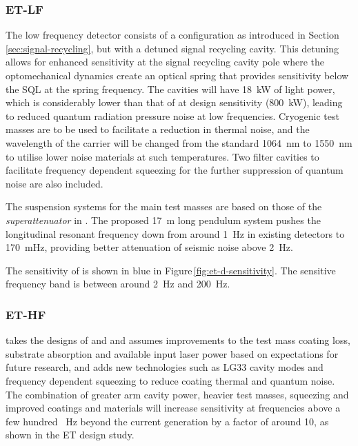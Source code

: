 \subsubsection{ET-LF}
The low frequency detector consists of a \DRFPMI{} configuration as introduced in Section\,\ref{sec:signal-recycling}, but with a detuned signal recycling cavity. This detuning allows for enhanced sensitivity at the signal recycling cavity pole where the optomechanical dynamics create an optical spring that provides sensitivity below the \gls{SQL} at the spring frequency. The cavities will have \SI{18}{\kilo\watt} of light power, which is considerably lower than that of \ALIGO{} at design sensitivity (\SI{800}{\kilo\watt}), leading to reduced quantum radiation pressure noise at low frequencies. Cryogenic test masses are to be used to facilitate a reduction in thermal noise, and the wavelength of the carrier will be changed from the standard \SI{1064}{\nano\meter} to \SI{1550}{\nano\meter} to utilise lower noise materials at such temperatures. Two filter cavities to facilitate frequency dependent squeezing for the further suppression of quantum noise are also included.

The suspension systems for the main test masses are based on those of the \emph{superattenuator} in \VIRGO{} \cite{Acernese2010}. The proposed \SI{17}{\meter} long pendulum system pushes the longitudinal resonant frequency down from around \SI{1}{\hertz} in existing detectors to \SI{170}{\milli\hertz}, providing better attenuation of seismic noise above \SI{2}{\hertz}.

The sensitivity of \ETLF{} is shown in blue in Figure\,\ref{fig:et-d-sensitivity}. The sensitive frequency band is between around \SI{2}{\hertz} and \SI{200}{\hertz}.

\subsubsection{ET-HF}
\ETHF{} takes the designs of \ALIGO{} and \AVIRGO{} and assumes improvements to the test mass coating loss, substrate absorption and available input laser power based on expectations for future research, and adds new technologies such as LG33 cavity modes \cite{Carbone2013} and frequency dependent squeezing \cite{Kimble2001} to reduce coating thermal and quantum noise. The combination of greater arm cavity power, heavier test masses, squeezing and improved coatings and materials will increase sensitivity at frequencies above a few hundred \SI{}{\hertz} beyond the current generation by a factor of around \num{10}, as shown in the \gls{ET} design study.

